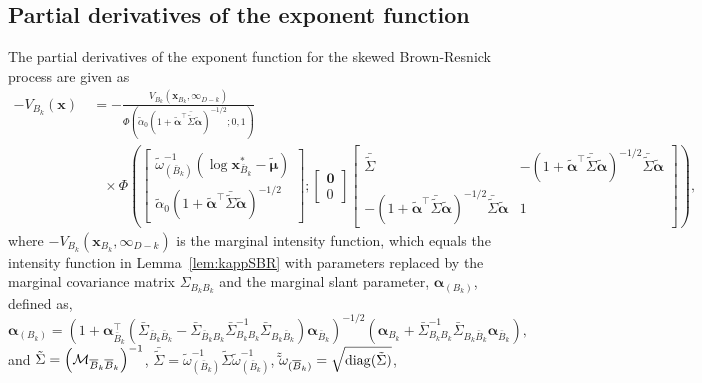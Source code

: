\documentclass[12pt]{article}
\begin{document}
\subsection{Partial derivatives of the exponent function}

\begin{lemma}
\label{lem:partial_BR}
The partial derivatives of the exponent function for the skewed Brown-Resnick process are given as
\begin{align*}
-V_{B_k}(\bm x) &\ =  - \frac{V_{B_k}(\bm x_{B_k},\bm \infty_{D-k})}{\Phi\left(\tilde\alpha_0\left(1+\tilde{\bm\alpha}^\top\bar{\tilde\Sigma}\tilde{\bm\alpha}\right)^{-1/2}; 0, 1\right)} \\
& \quad \times 
\Phi\left(
\begin{bmatrix} 
\tilde\omega^{-1}_{(\bar B_k)}(\log \bm x_{\bar B_k}^{*} - \tilde{\bm\mu})  \\
\tilde\alpha_0(1+\tilde{\bm\alpha}^\top\bar{\tilde\Sigma}\tilde{\bm\alpha})^{-1/2}
\end{bmatrix};
\begin{bmatrix}
\bm 0 \\ 0
\end{bmatrix}
\begin{bmatrix}
	\bar{\tilde\Sigma} & -(1+\tilde{\bm\alpha}^\top\bar{\tilde\Sigma}\tilde{\bm\alpha})^{-1/2}\bar{\tilde\Sigma}\tilde{\bm\alpha} \\
-(1+\tilde{\bm\alpha}^\top\bar{\tilde\Sigma}\tilde{\bm\alpha})^{-1/2}\bar{\tilde\Sigma}\tilde{\bm\alpha} &	1
\end{bmatrix} 
\right), 
\end{align*}
where $-V_{B_k}(\bm x_{B_k}, \bm \infty_{D-k})$ is the marginal intensity function, which equals the intensity function in Lemma~\ref{lem:kappSBR} with parameters replaced by the marginal covariance matrix $\Sigma_{B_kB_k}$ and the marginal slant parameter, $\bm\alpha_{(B_k)}$, defined as, 
$$\bm\alpha_{(B_k)} = \left(1+\bm\alpha_{\bar B_k}^\top\left(\bar\Sigma_{\bar B_k\bar B_k} -\bar \Sigma_{\bar B_k B_k}\bar\Sigma_{B_kB_k}^{-1}\bar\Sigma_{B_k\bar B_k}\right)\bm \alpha_{\bar B_k}\right)^{-1/2}\left(\bm \alpha_{B_k} + \bar\Sigma_{B_kB_k}^{-1}\bar\Sigma_{B_k\bar B_k}\bm\alpha_{\bar B_k}\right),$$
and
$\tilde\Sigma = \left({\mathcal M}_{{\overline{B}}_k{\overline{B}}_k}\right)^{-1}$, 
$\bar{\tilde\Sigma} = \tilde\omega_{(\bar B_k)}^{-1}\tilde\Sigma\tilde\omega_{(\bar B_k)}^{-1}$, $\tilde\tilde\omega_{({\overline{B}}_k)}=\sqrt{{\rm diag}(\tilde\Sigma)}$,\\

\end{lemma}
\end{document}
